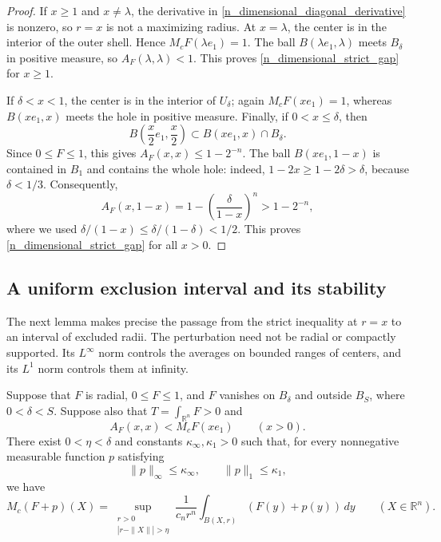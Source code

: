 \documentclass[12pt]{amsart}
\numberwithin{equation}{section}
\begin{document}
\begin{proof}
If $x\geq1$ and $x\ne\lambda$, the derivative in
\eqref{n_dimensional_diagonal_derivative} is nonzero, so $r=x$
is not a maximizing radius. At $x=\lambda$, the center is in the
interior of the outer shell. Hence $M_cF(\lambda e_1)=1$.
The ball $B(\lambda e_1,\lambda)$ meets $B_\delta$ in positive
measure, so $A_F(\lambda,\lambda)<1$.
This proves \eqref{n_dimensional_strict_gap} for $x\geq1$.

If $\delta<x<1$, the center is in the interior of $U_\delta$;
again $M_cF(xe_1)=1$, whereas $B(xe_1,x)$ meets the hole in
positive measure. Finally, if $0<x\leq\delta$, then
\[
B\left(\frac{x}{2}e_1,\frac{x}{2}\right)
       \subset B(xe_1,x)\cap B_\delta.
\]
Since $0\leq F\leq1$, this gives $A_F(x,x)\leq1-2^{-n}$.
The ball $B(xe_1,1-x)$ is contained in $B_1$ and contains the
whole hole: indeed, $1-2x\geq1-2\delta>\delta$, because
$\delta<1/3$. Consequently,
\[
A_F(x,1-x)=1-\left(\frac{\delta}{1-x}\right)^n
       >1-2^{-n},
\]
where we used $\delta/(1-x)\leq\delta/(1-\delta)<1/2$.
This proves \eqref{n_dimensional_strict_gap} for all $x>0$.
\end{proof}

\subsection{A uniform exclusion interval and its stability}

The next lemma makes precise the passage from the strict inequality
at $r=x$ to an interval of excluded radii. The perturbation need not
be radial or compactly supported. Its $L^\infty$ norm controls the
averages on bounded ranges of centers, and its $L^1$ norm controls
them at infinity.

\begin{lemma}
\label{n_dimensional_stability}
Suppose that $F$ is radial, $0\leq F\leq1$, and $F$ vanishes on
$B_\delta$ and outside $B_S$, where $0<\delta<S$. Suppose also that
$T=\int_{\mathbb{R}^n}F>0$ and
\[
A_F(x,x)<M_cF(xe_1)\qquad(x>0).
\]
There exist $0<\eta<\delta$ and constants
$\kappa_\infty,\kappa_1>0$ such that, for every nonnegative
measurable function $p$ satisfying
\begin{equation}
\label{n_dimensional_small_perturbation}
\|p\|_\infty\leq\kappa_\infty,
\qquad \|p\|_1\leq\kappa_1,
\end{equation}
we have
\begin{equation}
\label{n_dimensional_safe_radii}
M_c(F+p)(X)=
\sup_{\substack{r>0\\|r-\|X\||>\eta}}
 \frac{1}{c_nr^n}\int_{B(X,r)}(F(y)+p(y))\,dy
       \qquad(X\in\mathbb{R}^n).
\end{equation}
\end{lemma}
\end{document}
